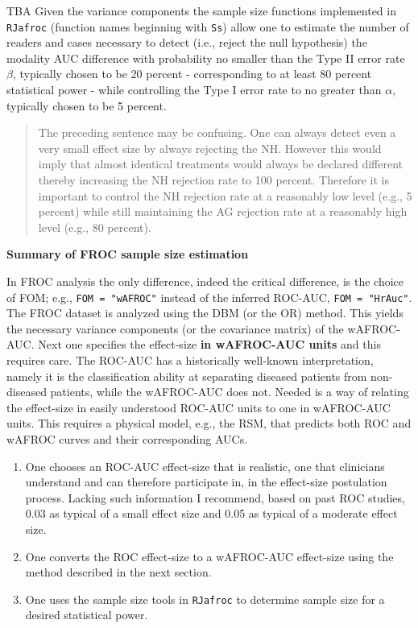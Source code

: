 \documentclass[
]{book}
\providecommand{\tightlist}{%
  \setlength{\itemsep}{0pt}\setlength{\parskip}{0pt}}
\begin{document}
TBA Given the variance components the sample size functions implemented in \texttt{RJafroc} (function names beginning with \texttt{Ss}) allow one to estimate the number of readers and cases necessary to detect (i.e., reject the null hypothesis) the modality AUC difference with probability no smaller than the Type II error rate \(\beta\), typically chosen to be 20 percent - corresponding to at least 80 percent statistical power - while controlling the Type I error rate to no greater than \(\alpha\), typically chosen to be 5 percent.

\begin{quote}
The preceding sentence may be confusing. One can always detect even a very small effect size by always rejecting the NH. However this would imply that almost identical treatments would always be declared different thereby increasing the NH rejection rate to 100 percent. Therefore it is important to control the NH rejection rate at a reasonably low level (e.g., 5 percent) while still maintaining the AG rejection rate at a reasonably high level (e.g., 80 percent).
\end{quote}

\textbf{Summary of FROC sample size estimation}

In FROC analysis the only difference, indeed the critical difference, is the choice of FOM; e.g., \texttt{FOM\ =\ "wAFROC"} instead of the inferred ROC-AUC, \texttt{FOM\ =\ "HrAuc"}. The FROC dataset is analyzed using the DBM (or the OR) method. This yields the necessary variance components (or the covariance matrix) of the wAFROC-AUC. Next one specifies the effect-size \textbf{in wAFROC-AUC units} and this requires care. The ROC-AUC has a historically well-known interpretation, namely it is the classification ability at separating diseased patients from non-diseased patients, while the wAFROC-AUC does not. Needed is a way of relating the effect-size in easily understood ROC-AUC units to one in wAFROC-AUC units. This requires a physical model, e.g., the RSM, that predicts both ROC and wAFROC curves and their corresponding AUCs.

\begin{enumerate}
\def\labelenumi{\arabic{enumi}.}
\tightlist
\item
  One chooses an ROC-AUC effect-size that is realistic, one that clinicians understand and can therefore participate in, in the effect-size postulation process. Lacking such information I recommend, based on past ROC studies, 0.03 as typical of a small effect size and 0.05 as typical of a moderate effect size.
\item
  One converts the ROC effect-size to a wAFROC-AUC effect-size using the method described in the next section.
\item
  One uses the sample size tools in \texttt{RJafroc} to determine sample size for a desired statistical power.
\end{enumerate}
\end{document}
